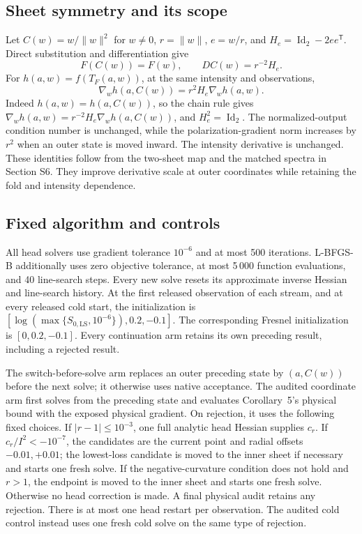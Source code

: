 \subsection{Sheet symmetry and its scope}
Let $C(w)=w/\|w\|^2$ for $w\ne0$, $r=\|w\|$, $e=w/r$, and $H_e=\operatorname{Id}_2-2ee^{\mathsf T}$. Direct substitution and differentiation give
\begin{equation}
 F(C(w))=F(w),\qquad DC(w)=r^{-2}H_e.
 \label{SI-eq:chartidentity}
\end{equation}
For $h(a,w)=f(T_F(a,w))$, at the same intensity and observations,
\begin{equation}
 \nabla_w h(a,C(w))=r^2H_e\nabla_w h(a,w).
 \label{SI-eq:chartgradient}
\end{equation}
Indeed $h(a,w)=h(a,C(w))$, so the chain rule gives $\nabla_w h(a,w)=r^{-2}H_e\nabla_w h(a,C(w))$, and $H_e^2=\operatorname{Id}_2$. The normalized-output condition number is unchanged, while the polarization-gradient norm increases by $r^2$ when an outer state is moved inward. The intensity derivative is unchanged. These identities follow from the two-sheet map and the matched spectra in Section S6. They improve derivative scale at outer coordinates while retaining the fold and intensity dependence.

\subsection{Fixed algorithm and controls}
All head solvers use gradient tolerance $10^{-6}$ and at most 500 iterations. L-BFGS-B additionally uses zero objective tolerance, at most 5\,000 function evaluations, and 40 line-search steps. Every new solve resets its approximate inverse Hessian and line-search history. At the first released observation of each stream, and at every released cold start, the initialization is $[\log(\max\{S_{0,\mathrm{LS}},10^{-6}\}),0.2,-0.1]$. The corresponding Fresnel initialization is $[0,0.2,-0.1]$. Every continuation arm retains its own preceding result, including a rejected result.

The switch-before-solve arm replaces an outer preceding state by $(a,C(w))$ before the next solve; it otherwise uses native acceptance. The audited coordinate arm first solves from the preceding state and evaluates Corollary~5's physical bound with the exposed physical gradient. On rejection, it uses the following fixed choices. If $|r-1|\le10^{-3}$, one full analytic head Hessian supplies $c_r$. If $c_r/I^2<-10^{-7}$, the candidates are the current point and radial offsets $-0.01,+0.01$; the lowest-loss candidate is moved to the inner sheet if necessary and starts one fresh solve. If the negative-curvature condition does not hold and $r>1$, the endpoint is moved to the inner sheet and starts one fresh solve. Otherwise no head correction is made. A final physical audit retains any rejection. There is at most one head restart per observation. The audited cold control instead uses one fresh cold solve on the same type of rejection.

